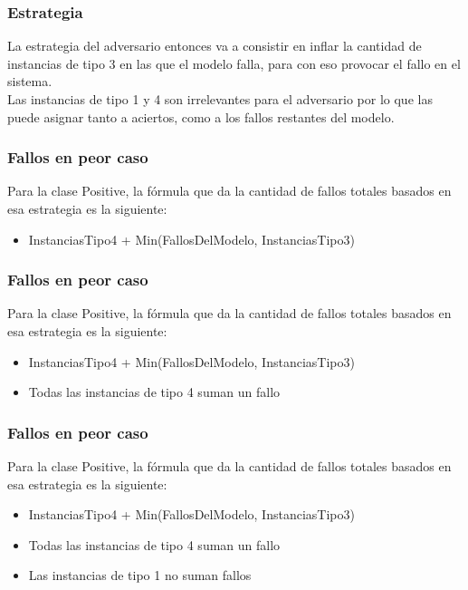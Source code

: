 \begin{frame}
\frametitle{Estrategia}
\vspace{3mm}
La estrategia del adversario entonces va a consistir en inflar la cantidad de instancias de tipo 3 en las que el modelo falla, para con eso provocar el fallo en el sistema. \\
\vspace{3mm}
Las instancias de tipo 1 y 4 son irrelevantes para el adversario por lo que las puede asignar tanto a aciertos, como a los fallos restantes del modelo.
\end{frame}



\begin{frame}[t]
\frametitle{Fallos en peor caso}
\vspace{6mm}
Para la clase Positive, la f\'ormula que da la cantidad de fallos totales basados en esa estrategia es la siguiente:
\vspace{3mm}
\begin{itemize}
    \item InstanciasTipo4 + Min(FallosDelModelo, InstanciasTipo3)
\end{itemize}
\end{frame}



\begin{frame}[t]
\frametitle{Fallos en peor caso}
\vspace{6mm}
Para la clase Positive, la f\'ormula que da la cantidad de fallos totales basados en esa estrategia es la siguiente:
\vspace{3mm}
\begin{itemize}
    \item InstanciasTipo4 + Min(FallosDelModelo, InstanciasTipo3)
\end{itemize}
\vspace{3mm}
\begin{itemize}
    \item Todas las instancias de tipo 4 suman un fallo
\end{itemize}
\end{frame}



\begin{frame}[t]
\frametitle{Fallos en peor caso}
\vspace{6mm}
Para la clase Positive, la f\'ormula que da la cantidad de fallos totales basados en esa estrategia es la siguiente:
\vspace{3mm}
\begin{itemize}
    \item InstanciasTipo4 + Min(FallosDelModelo, InstanciasTipo3)
\end{itemize}
\vspace{3mm}
\begin{itemize}
    \item Todas las instancias de tipo 4 suman un fallo
    \item Las instancias de tipo 1 no suman fallos
\end{itemize}
\end{frame}



